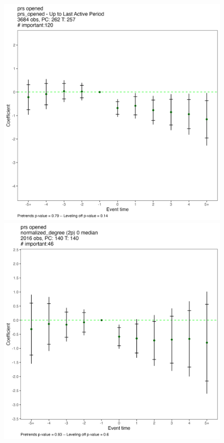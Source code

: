 \begin{figure}[htbp]
    \centering
    \begin{minipage}[b]{0.32\textwidth}
        \centering
        \includegraphics[width=\textwidth]{temp/normalized_degree/all_prs_opened_early_sample.png}
    \end{minipage}
    \hfill
    \begin{minipage}[b]{0.32\textwidth}
        \centering
        \includegraphics[width=\textwidth]{temp/normalized_degree/all_normalized_degree_2p_0_median.png}

\end{minipage}
\end{figure}
